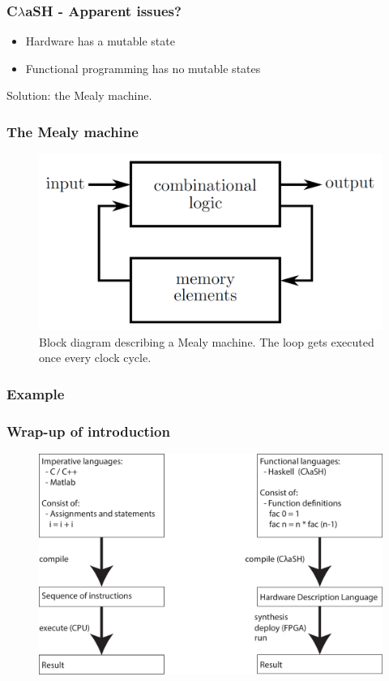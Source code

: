 \documentclass{beamer}[10]
\newcommand{\clash}{C$\lambda$aSH}
\begin{document}
\begin{frame}
	\frametitle{\clash{} - Apparent issues?}
	\begin{itemize}
		\item Hardware has a mutable state
		\item Functional programming has no mutable states
	\end{itemize}
	
	\pause
	\vspace{15pt}
	Solution: the Mealy machine.
\end{frame}

\begin{frame}
	\frametitle{The Mealy machine}
	\begin{figure}
		\centering
		\includegraphics[width=1\columnwidth]{figs/mealy_machine.png}
		\caption{Block diagram describing a Mealy machine. The loop gets executed once every clock cycle.}
	\end{figure}
\end{frame}
	
\begin{frame}
	\frametitle{Example}
	
\end{frame}


\begin{frame}
	\frametitle{Wrap-up of introduction}
	\begin{figure}
		\centering
		\includegraphics[width=\columnwidth]{figs/functional-vs-imperative}
	\end{figure}
\end{frame}
\end{document}

